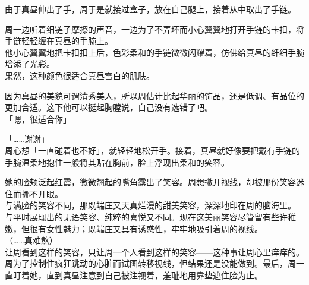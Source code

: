 由于真昼伸出了手，周于是就接过盒子，放在自己腿上，接着从中取出了手链。

周一边听着细链子摩擦的声音，一边为了不弄坏而小心翼翼地打开手链的卡扣，将手链轻轻缠在真昼的手腕上。\\

他小心翼翼地把卡扣扣上后，色彩柔和的手链微微闪耀着，仿佛给真昼的纤细手腕增添了光彩。\\

果然，这种颜色很适合真昼雪白的肌肤。

因为真昼的美貌可谓清秀美人，所以周估计比起华丽的饰品，还是低调、有品位的更加合适。这下他可以挺起胸膛说，自己没有选错了吧。\\

「嗯，很适合你」

「……谢谢」\\

周心想「一直碰着也不好」，就轻轻地松开手。接着，真昼就好像要把戴有手链的手腕温柔地抱住一般将其贴在胸前，脸上浮现出柔和的笑容。

她的脸颊泛起红霞，微微翘起的嘴角露出了笑容。周想撇开视线，却被那份笑容迷住而挪不开眼。\\

与满脸的笑容不同，那既端庄又天真烂漫的甜美笑容，深深地印在周的脑海里。\\

与平时展现出的无语笑容、纯粹的喜悦又不同。现在这美丽笑容尽管留有些许稚嫩，但很有女性魅力；既端庄又具有诱惑性，牢牢地吸引着周的视线。\\

（……真难熬）\\

让周看到这样的笑容，只让周一个人看到这样的笑容——这种事让周心里痒痒的。\\

周为了控制住疯狂跳动的心脏而试图转移视线，但结果还是没能做到。最后，周一直盯着她，直到真昼注意到自己被注视着，羞耻地用靠垫遮住脸为止。
